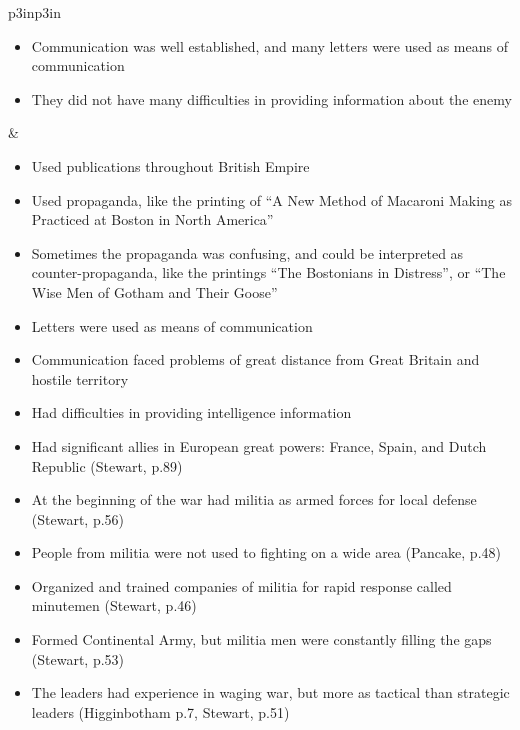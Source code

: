 \begin{singlespace}
\begin{mpxtabular}{p{3in}p{3in}}
\begin{itemize}[nolistsep,leftmargin=*]
	      Liberty poles
	      erected \cite[3,48-53,81,227]{knollenberg_growth_2003} \cite[101]{ladenburg_causes_1989}
	    \item  Communication was well established, and many letters were
	      used as means of communication \cite[167,264]{knollenberg_growth_2003}
	    \item  They did not have many difficulties in providing information
	      about the enemy \cite[63]{ladenburg_causes_1989}
	\end{itemize}
	&
	\begin{itemize}[nolistsep,leftmargin=*]
	    \item  Used publications throughout British Empire
	    \item  Used propaganda, like the printing of  “A New Method of
	      Macaroni Making as Practiced at Boston in North America”
	    \item  Sometimes the propaganda was confusing, and could be
	      interpreted as counter-propaganda, like the printings “The
	      Bostonians in Distress”, or “The Wise Men of Gotham and Their
	      Goose” \cite[168-169]{knollenberg_growth_2003}
	    \item  Letters were used as means of communication \cite[169]{knollenberg_growth_2003}
	    \item  Communication faced problems of great distance from Great Britain and hostile territory
	    \item  Had difficulties in providing intelligence information \cite[545]{mackesy1962british}
	\end{itemize}\ML
	\ML
	\begin{itemize}[nolistsep,leftmargin=*]
	    \item  Had significant allies in European great powers: France, Spain, and Dutch Republic (Stewart, p.89) 
	    \item  At the beginning of the war had militia as armed forces for local defense (Stewart, p.56) 
	    \item  People from militia were not used to fighting on a wide area (Pancake, p.48) 
	    \item  Organized and trained companies of militia for rapid response called minutemen (Stewart, p.46) 
	    \item  Formed Continental Army, but militia men were constantly filling the gaps (Stewart, p.53) 
	    \item  The leaders had experience in waging war, but more as tactical than strategic leaders (Higginbotham p.7, Stewart, p.51) 

\end{itemize}
\end{mpxtabular}
\end{singlespace}
